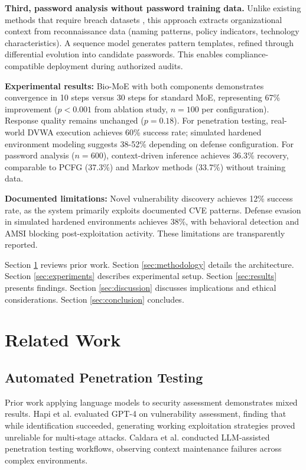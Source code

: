 \documentclass[preprint,12pt]{elsarticle}
\begin{document}
\textbf{Third, password analysis without password training data.} Unlike existing methods that require breach datasets \cite{passgpt2024}, this approach extracts organizational context from reconnaissance data (naming patterns, policy indicators, technology characteristics). A sequence model generates pattern templates, refined through differential evolution into candidate passwords. This enables compliance-compatible deployment during authorized audits.

\textbf{Experimental results:} Bio-MoE with both components demonstrates convergence in 10 steps versus 30 steps for standard MoE, representing 67\% improvement ($p<0.001$ from ablation study, $n=100$ per configuration). Response quality remains unchanged ($p=0.18$). For penetration testing, real-world DVWA execution achieves 60\% success rate; simulated hardened environment modeling suggests 38-52\% depending on defense configuration. For password analysis ($n=600$), context-driven inference achieves 36.3\% recovery, comparable to PCFG (37.3\%) and Markov methods (33.7\%) without training data.

\textbf{Documented limitations:} Novel vulnerability discovery achieves 12\% success rate, as the system primarily exploits documented CVE patterns. Defense evasion in simulated hardened environments achieves 38\%, with behavioral detection and AMSI blocking post-exploitation activity. These limitations are transparently reported.

Section \ref{sec:related} reviews prior work. Section \ref{sec:methodology} details the architecture. Section \ref{sec:experiments} describes experimental setup. Section \ref{sec:results} presents findings. Section \ref{sec:discussion} discusses implications and ethical considerations. Section \ref{sec:conclusion} concludes.

\section{Related Work}
\label{sec:related}

\subsection{Automated Penetration Testing}

Prior work applying language models to security assessment demonstrates mixed results. Hapi et al. \cite{hapi2023} evaluated GPT-4 on vulnerability assessment, finding that while identification succeeded, generating working exploitation strategies proved unreliable for multi-stage attacks. Caldara et al. \cite{caldara2024} conducted LLM-assisted penetration testing workflows, observing context maintenance failures across complex environments.
\end{document}
